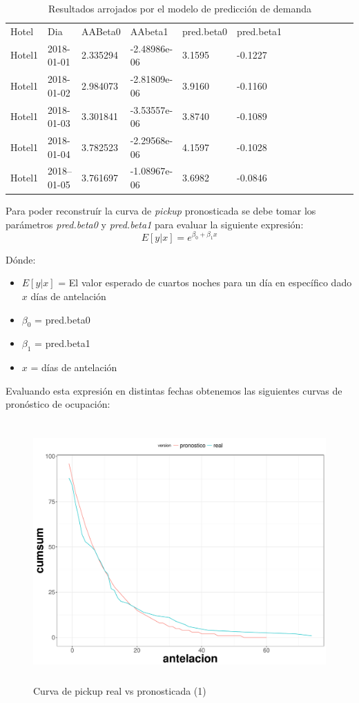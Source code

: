 \begin{table}[H]

\begin{tabular}{lllllllllllll}
Hotel  & Dia         & AABeta0  & AAbeta1      & pred.beta0 & pred.beta1  \\
Hotel1 & 2018-01-01  & 2.335294 & -2.48986e-06 & 3.1595     & -0.1227     \\
Hotel1 & 2018-01-02  & 2.984073 & -2.81809e-06 & 3.9160     & -0.1160     \\
Hotel1 & 2018-01-03  & 3.301841 & -3.53557e-06 & 3.8740     & -0.1089     \\
Hotel1 & 2018-01-04  & 3.782523 & -2.29568e-06 & 4.1597     & -0.1028     \\
Hotel1 & 2018--01-05 & 3.761697 & -1.08967e-06 & 3.6982     & -0.0846    
\end{tabular}
\caption{Resultados arrojados por el modelo de predicción de demanda} 
\end{table}

Para poder reconstruír la curva de \emph{pickup} pronosticada se debe tomar los parámetros \emph{pred.beta0} y \emph{pred.beta1} para evaluar la siguiente expresión: $$E[y|x]=e^{\beta_0 + \beta_1x}$$

Dónde:
\begin{itemize}[noitemsep]
\item $E[y|x]$ = El valor esperado de cuartos noches para un día en específico dado $x$ días de antelación
\item $\beta_0$ = pred.beta0
\item $\beta_1$ = pred.beta1
\item $x$ = días de antelación
\end{itemize}

Evaluando esta expresión en distintas fechas obtenemos las siguientes curvas de pronóstico de ocupación:

\begin{figure}[H]
  \centering
      \includegraphics[width=\maxwidth,height=10cm]{figures/Resultados-1}  
  \caption{Curva de pickup real vs pronosticada (1)}
\end{figure}

